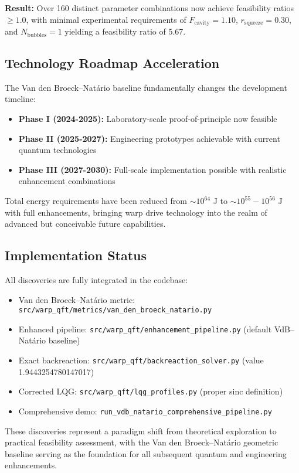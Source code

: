 \documentclass[11pt]{article}
\begin{document}
\textbf{Result:} Over 160 distinct parameter combinations now achieve feasibility ratios $\geq 1.0$, with minimal experimental requirements of $F_{\text{cavity}} = 1.10$, $r_{\text{squeeze}} = 0.30$, and $N_{\text{bubbles}} = 1$ yielding a feasibility ratio of 5.67.

\subsection{Technology Roadmap Acceleration}
The Van den Broeck–Natário baseline fundamentally changes the development timeline:
\begin{itemize}
\item \textbf{Phase I (2024-2025):} Laboratory-scale proof-of-principle now feasible
\item \textbf{Phase II (2025-2027):} Engineering prototypes achievable with current quantum technologies  
\item \textbf{Phase III (2027-2030):} Full-scale implementation possible with realistic enhancement combinations
\end{itemize}

Total energy requirements have been reduced from $\sim 10^{64}$ J to $\sim 10^{55}-10^{56}$ J with full enhancements, bringing warp drive technology into the realm of advanced but conceivable future capabilities.

\subsection{Implementation Status}
All discoveries are fully integrated in the codebase:
\begin{itemize}
\item Van den Broeck–Natário metric: \texttt{src/warp\_qft/metrics/van\_den\_broeck\_natario.py}
\item Enhanced pipeline: \texttt{src/warp\_qft/enhancement\_pipeline.py} (default VdB–Natário baseline)
\item Exact backreaction: \texttt{src/warp\_qft/backreaction\_solver.py} (value 1.9443254780147017)
\item Corrected LQG: \texttt{src/warp\_qft/lqg\_profiles.py} (proper sinc definition)
\item Comprehensive demo: \texttt{run\_vdb\_natario\_comprehensive\_pipeline.py}
\end{itemize}

These discoveries represent a paradigm shift from theoretical exploration to practical feasibility assessment, with the Van den Broeck–Natário geometric baseline serving as the foundation for all subsequent quantum and engineering enhancements.
\end{document}
